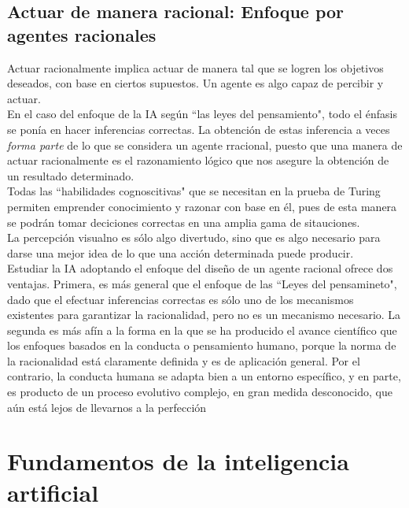\documentclass[12pt,a4paper]{report}
\begin{document}
\subsection*{Actuar de manera racional: Enfoque por agentes racionales}
Actuar racionalmente implica actuar de manera tal que se logren los objetivos deseados, con base en ciertos supuestos. Un agente es algo capaz de percibir y actuar.\\En el caso del enfoque de la IA según ``las leyes del pensamiento", todo el énfasis se ponía en hacer inferencias correctas. La obtención de estas inferencia a veces \textit{forma parte} de lo que se considera un agente rracional, puesto que una manera de actuar racionalmente es el razonamiento lógico que nos asegure la obtención de un resultado determinado.\\Todas las ``habilidades cognoscitivas" que se necesitan en la prueba de Turing permiten emprender conocimiento y razonar con base en él, pues de esta manera se podrán tomar deciciones correctas en una amplia gama de sitauciones.\\La percepción visualno es sólo algo divertudo, sino que es algo necesario para darse una mejor idea de lo que una acción determinada puede producir.\\Estudiar la IA adoptando el enfoque del diseño de un agente racional ofrece dos ventajas. Primera, es más general que el enfoque de las ``Leyes del pensamineto", dado que el efectuar inferencias correctas es sólo uno de los mecanismos existentes para garantizar la racionalidad, pero no es un mecanismo necesario. La segunda es más afín a la forma en la que se ha producido el avance científico que los enfoques basados en la conducta o pensamiento humano, porque la norma de la racionalidad está claramente definida y es de aplicación general. Por el contrario, la conducta humana se adapta bien a un entorno específico, y en parte, es producto de un proceso evolutivo complejo, en gran medida desconocido, que aún está lejos de llevarnos a la perfección
\section{Fundamentos de la inteligencia artificial}
\end{document}
